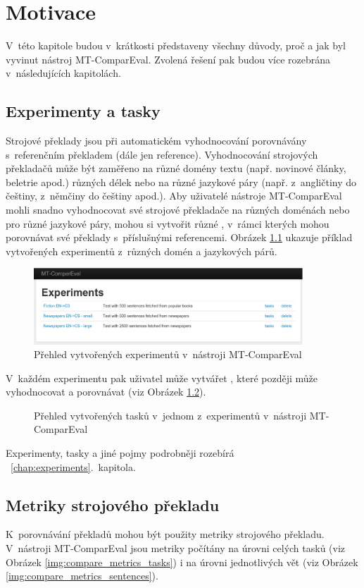 \chapter{Motivace}
\label{chap:motivation}
V~této kapitole budou v~krátkosti představeny všechny důvody,
  proč a jak byl vyvinut nástroj \mbox{MT-ComparEval}.
Zvolená řešení pak budou více rozebrána v~následujících kapitolách.

\section{Experimenty a tasky}
Strojové překlady jsou při automatickém vyhodnocování porovnávány s~referenčním překladem
  (dále jen reference).
Vyhodnocování strojových překladačů může být zaměřeno na různé domény textu (např. novinové články, beletrie apod.) různých délek
  nebo na různé jazykové páry (např. z~angličtiny do češtiny, z~němčiny do češtiny apod.).
Aby uživatelé nástroje \mbox{MT-ComparEval} mohli snadno vyhodnocovat své strojové překladače na různých doménách nebo pro různé jazykové páry,
  mohou si vytvořit různé \textbf{},
  v~rámci kterých mohou porovnávat své překlady s~příslušnými referencemi.
Obrázek \ref{img:experiments} ukazuje příklad vytvořených experimentů z~různých domén a jazykových párů.
\begin{figure}
	\center
	\includegraphics[width=0.9\textwidth]{img/experiments.eps}

	\caption{Přehled vytvořených experimentů v~nástroji \mbox{MT-ComparEval}}
	\label{img:experiments}
\end{figure}

V~každém experimentu pak uživatel může vytvářet \textbf{},
  které později může vyhodnocovat a porovnávat (viz Obrázek \ref{img:tasks}).
\begin{figure}
	\caption{Přehled vytvořených tasků v~jednom z~experimentů v~nástroji \mbox{MT-ComparEval}}
	\label{img:tasks}
\end{figure}

Experimenty, tasky a jiné pojmy podrobněji rozebírá ~\ref{chap:experiments}.~kapitola.


\section{Metriky strojového překladu}
K~porovnávání překladů mohou být použity metriky strojového překladu.
V~nástroji \mbox{MT-ComparEval} jsou metriky počítány na úrovni celých tasků 
  (viz Obrázek \ref{img:compare_metrics_tasks})
  i na úrovni jednotlivých vět
  (viz Obrázek \ref{img:compare_metrics_sentences}).

